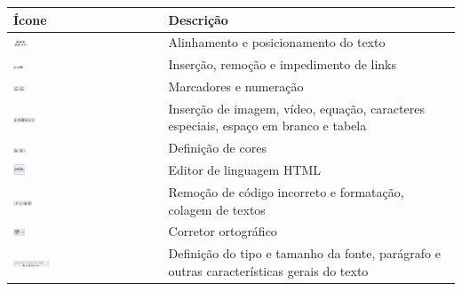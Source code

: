 \begin{table}[htbp]
\begin{flushleft}
\begin{tabular}{p{8cm}|p{6cm}} \hline
\rowcolor[rgb]{0.8,0.8,0.8} \textbf{Ícone}& \textbf{Descrição}\\\hline
\includegraphics[width=0.1\textwidth]{imagem/cap4/fig2.jpg} & Alinhamento e posicionamento do texto \\\hline
\includegraphics[width=0.07\textwidth]{imagem/cap4/fig3.jpg} & Inserção, remoção e impedimento de links \\\hline
\includegraphics[width=0.08\textwidth]{imagem/cap4/fig4.jpg} & Marcadores e numeração \\\hline
\includegraphics[width=0.15\textwidth]{imagem/cap4/fig5.jpg} & Inserção de imagem, vídeo, equação, caracteres especiais, espaço em branco e tabela\\\hline
\includegraphics[width=0.09\textwidth]{imagem/cap4/fig6.jpg} & Definição de cores\\\hline
\includegraphics[width=0.09\textwidth]{imagem/cap4/fig7.jpg} & Editor de linguagem HTML\\\hline
\includegraphics[width=0.13\textwidth]{imagem/cap4/fig8.jpg} & Remoção de código incorreto e formatação, colagem de textos\\\hline
\includegraphics[width=0.08\textwidth]{imagem/cap4/fig9.jpg} & Corretor ortográfico\\\hline
\includegraphics[width=0.25\textwidth]{imagem/cap4/fig10.jpg} & Definição do tipo e tamanho da fonte, parágrafo e outras características gerais do texto\\\hline

\end{tabular}
\end{flushleft}
\end{table}
